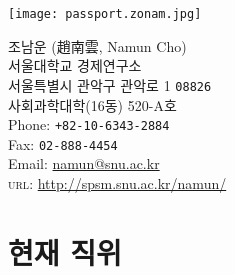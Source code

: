 \documentclass[11pt, a4paper]{article} %
\begin{document}

\texttt{[image: passport.zonam.jpg]}

{\LARGE 조남운 (趙南雲, Namun Cho)}\\[1cm] %
서울대학교 경제연구소\\ %
서울특별시 관악구 관악로 1 \texttt{08826}\\
사회과학대학(16동) 520-A호
\\[.2cm]
Phone: \texttt{+82-10-6343-2884}\\ %
Fax: \texttt{02-888-4454}\\[.2cm] %
Email: \href{mailto:namun@snu.ac.kr}{namun@snu.ac.kr}\\ %
\textsc{url}: \href{http://spsm.snu.ac.kr/namun/}{http://spsm.snu.ac.kr/namun/}\\ %






\section*{현재 직위}
\end{document}
